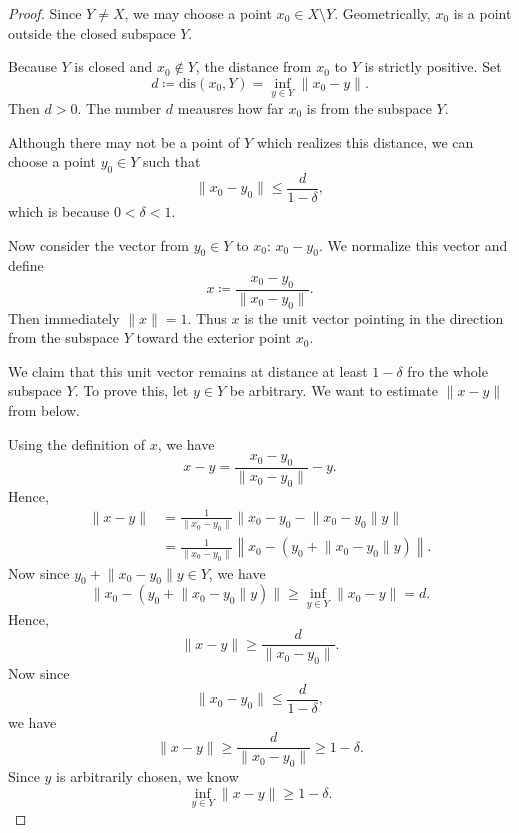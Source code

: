 \begin{proof}
    Since \(Y \neq X\), we may choose a point \(x_0 \in X \setminus Y\). Geometrically, \(x_0\) is a point outside the closed subspace \(Y\). 

    Because \(Y\) is closed and \(x_0 \notin Y\), the distance from \(x_0\) to \(Y\) is strictly positive. Set 
    \[
        d \coloneqq \mathrm{dis}(x_0, Y) = \inf _{y \in Y} \lVert x_0 - y \rVert.  
    \]        
    Then \(d > 0\). The number \(d\) meausres how far \(x_0\) is from the subspace \(Y\). 

    Although there may not be a point of \(Y\) which realizes this distance, we can choose a point \(y_0 \in Y\) such that 
    \[
        \lVert x_0 - y_0 \rVert \le \frac{d}{1 - \delta},
    \]      
    which is because \(0 < \delta < 1\). 

    Now consider the vector from \(y_0 \in Y\) to \(x_0\): \(x_0 - y_0\). We normalize this vector and define 
    \[
        x \coloneqq \frac{x_0 - y_0}{\lVert x_0 - y_0 \rVert }. 
    \]    
    Then immediately \(\lVert x \rVert = 1\). Thus \(x\) is the unit vector pointing in the direction from the subspace \(Y\) toward the exterior point \(x_0\). 

    We claim that this unit vector remains at distance at least \(1 - \delta\) fro the whole subspace \(Y\). To prove this, let \(y \in Y\) be arbitrary. We want to estimate \(\lVert x - y \rVert \) from below. 

    Using the definition of \(x\), we have 
    \[
        x - y = \frac{x_0 - y_0}{\lVert x_0 - y_0 \rVert } - y.
    \]         
    Hence, 
    \begin{align*}
        \lVert x - y \rVert &= \frac{1}{\lVert x_0 - y_0 \rVert } \lVert x_0 - y_0 - \lVert x_0 - y_0 \rVert y  \rVert \\
        &= \frac{1}{\lVert x_0 - y_0 \rVert } \left\lVert x_0 - (y_0 + \lVert x_0 - y_0 \rVert y ) \right\rVert.  
    \end{align*}
    Now since \(y_0 + \lVert x_0 - y_0 \rVert y \in Y \), we have 
    \[
        \lVert x_0 - (y_0 + \lVert x_0 - y_0 \rVert y ) \rVert \ge \inf _{y \in Y} \lVert x_0 - y \rVert = d. 
    \] 
    Hence,
    \[
        \lVert x - y \rVert \ge \frac{d}{\lVert x_0 - y_0 \rVert }. 
    \]
    Now since 
    \[
        \lVert x_0 - y_0 \rVert \le \frac{d}{1 - \delta}, 
    \]
    we have 
    \[
        \lVert x - y \rVert \ge \frac{d}{\lVert x_0 - y_0 \rVert} \ge 1 - \delta. 
    \]
    Since \(y\) is arbitrarily chosen, we know 
    \[
        \inf _{y \in Y} \lVert x - y \rVert \ge 1 - \delta. 
    \] 
\end{proof}

